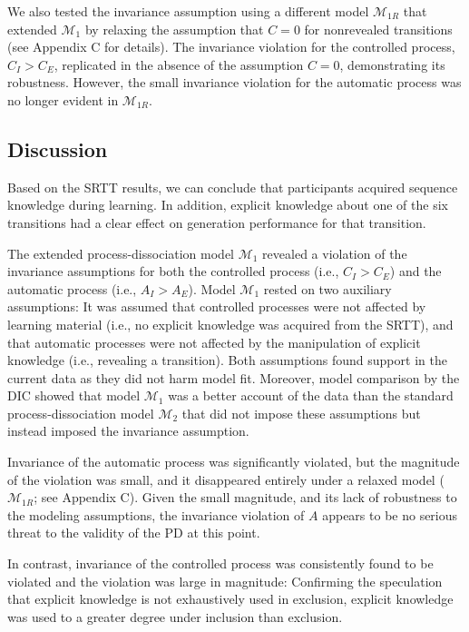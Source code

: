 \documentclass[man]{apa6}
\theoremstyle{definition}
\theoremstyle{definition}
\theoremstyle{definition}
\theoremstyle{remark}
\begin{document}
We also tested the invariance assumption using a different model
\(\mathcal{M}_{1R}\) that extended \(\mathcal{M}_1\) by relaxing the
assumption that \(C = 0\) for nonrevealed transitions (see Appendix C
for details). The invariance violation for the controlled process,
\(C_I > C_E\), replicated in the absence of the assumption \(C=0\),
demonstrating its robustness. However, the small invariance violation
for the automatic process was no longer evident in \(\mathcal{M}_{1R}\).

\subsection{Discussion}\label{discussion-1}

Based on the SRTT results, we can conclude that participants acquired
sequence knowledge during learning. In addition, explicit knowledge
about one of the six transitions had a clear effect on generation
performance for that transition.

The extended process-dissociation model \(\mathcal{M}_1\) revealed a
violation of the invariance assumptions for both the controlled process
(i.e., \(C_I > C_E\)) and the automatic process (i.e., \(A_I > A_E\)).
Model \(\mathcal{M}_1\) rested on two auxiliary assumptions: It was
assumed that controlled processes were not affected by learning material
(i.e., no explicit knowledge was acquired from the SRTT), and that
automatic processes were not affected by the manipulation of explicit
knowledge (i.e., revealing a transition). Both assumptions found support
in the current data as they did not harm model fit. Moreover, model
comparison by the DIC showed that model \(\mathcal{M}_1\) was a better
account of the data than the standard process-dissociation model
\(\mathcal{M}_2\) that did not impose these assumptions but instead
imposed the invariance assumption.

Invariance of the automatic process was significantly violated, but the
magnitude of the violation was small, and it disappeared entirely under
a relaxed model (\(\mathcal{M}_{1R}\); see Appendix C). Given the small
magnitude, and its lack of robustness to the modeling assumptions, the
invariance violation of \(A\) appears to be no serious threat to the
validity of the PD at this point.

In contrast, invariance of the controlled process was consistently found
to be violated and the violation was large in magnitude: Confirming the
speculation that explicit knowledge is not exhaustively used in
exclusion, explicit knowledge was used to a greater degree under
inclusion than exclusion.
\end{document}
